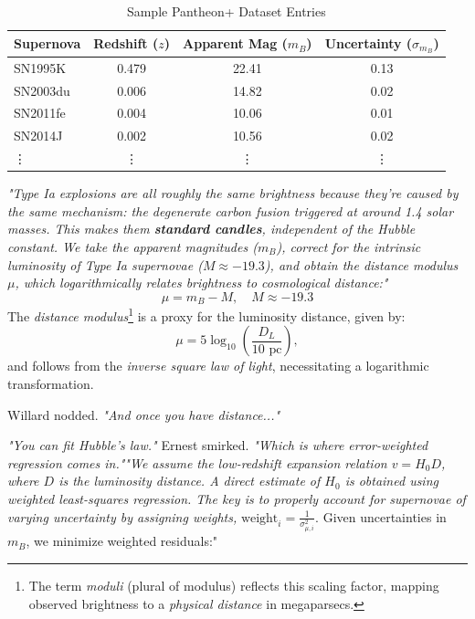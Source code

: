 \begin{table}[H]
    \centering
    \begin{tabular}{lccc}
        \toprule
        \textbf{Supernova} & \textbf{Redshift ($z$)} & \textbf{Apparent Mag ($m_B$)} & \textbf{Uncertainty ($\sigma_{m_B}$)} \\
        \midrule
        SN1995K  & 0.479 & 22.41 & 0.13 \\
        SN2003du & 0.006 & 14.82 & 0.02 \\
        SN2011fe & 0.004 & 10.06 & 0.01 \\
        SN2014J  & 0.002 & 10.56 & 0.02 \\
        \vdots & \vdots & \vdots & \vdots \\
    \end{tabular}
    \caption{Sample Pantheon+ Dataset Entries}
    \label{tab:pantheon}
\end{table}
\textit{"Type Ia explosions are all roughly the same brightness because they’re caused by the same mechanism: the degenerate carbon fusion triggered at around 1.4 solar masses. This makes them \textbf{standard candles}, independent of the Hubble constant. We take the \textit{apparent magnitudes} ($m_B$), correct for the intrinsic luminosity of Type Ia supernovae ($M \approx -19.3$), and obtain the \textit{distance modulus} $\mu$, which logarithmically relates brightness to cosmological distance:"}
\begin{equation*}
    \mu = m_B - M, \quad M \approx -19.3
\end{equation*}
The \textit{distance modulus}\footnote{The term \textit{moduli} (plural of modulus) reflects this scaling factor, mapping observed brightness to a \textit{physical distance} in megaparsecs.} is a proxy for the luminosity distance, given by:
\begin{equation*}
    \mu = 5 \log_{10} \left( \frac{D_L}{10 \text{ pc}} \right),
\end{equation*}
and follows from the \textit{inverse square law of light}, necessitating a logarithmic transformation. 

\smallskip

Willard nodded. \textit{"And once you have distance..."}

\textit{"You can fit Hubble's law."} Ernest smirked. \textit{"Which is where error-weighted regression comes in."}\textit{"We assume the low-redshift expansion relation $v = H_0 D$, where $D$ is the luminosity distance. A direct estimate of $H_0$ is obtained using weighted least-squares regression. The key is to properly account for supernovae of varying uncertainty by assigning weights,}
\(\text{weight}_i = \frac{1}{\sigma_{\mu, i}^2}.\) Given uncertainties in $m_B$, we minimize weighted residuals:"

